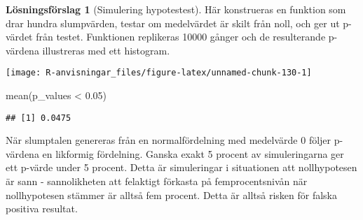 \documentclass[
]{book}
\newenvironment{Shaded}{\begin{snugshade}}{\end{snugshade}}
\newcommand{\AttributeTok}[1]{\textcolor[rgb]{0.77,0.63,0.00}{#1}}
\newcommand{\ControlFlowTok}[1]{\textcolor[rgb]{0.13,0.29,0.53}{\textbf{#1}}}
\newcommand{\DecValTok}[1]{\textcolor[rgb]{0.00,0.00,0.81}{#1}}
\newcommand{\FloatTok}[1]{\textcolor[rgb]{0.00,0.00,0.81}{#1}}
\newcommand{\FunctionTok}[1]{\textcolor[rgb]{0.00,0.00,0.00}{#1}}
\newcommand{\NormalTok}[1]{#1}
\newcommand{\OtherTok}[1]{\textcolor[rgb]{0.56,0.35,0.01}{#1}}
\newcommand{\SpecialCharTok}[1]{\textcolor[rgb]{0.00,0.00,0.00}{#1}}
\theoremstyle{definition}
\theoremstyle{definition}
\theoremstyle{definition}
\theoremstyle{definition}
\newtheorem{hypothesis}{Lösningsförslag}[chapter]
\theoremstyle{remark}
\begin{document}
\begin{hypothesis}[Simulering hypotestest]
Här konstrueras en funktion som drar hundra slumpvärden, testar om medelvärdet är skilt från noll, och ger ut p-värdet från testet. Funktionen replikeras 10000 gånger och de resulterande p-värdena illustreras med ett histogram.

\begin{Shaded}
\end{Shaded}

\begin{center}\texttt{[image: R-anvisningar\_files/figure-latex/unnamed-chunk-130-1]} \end{center}

\begin{Shaded}
\begin{Highlighting}[]
\FunctionTok{mean}\NormalTok{(p\_values }\SpecialCharTok{\textless{}} \FloatTok{0.05}\NormalTok{)}
\end{Highlighting}
\end{Shaded}

\begin{verbatim}
## [1] 0.0475
\end{verbatim}

När slumptalen genereras från en normalfördelning med medelvärde 0 följer p-värdena en likformig fördelning. Ganska exakt 5 procent av simuleringarna ger ett p-värde under 5 procent. Detta är simuleringar i situationen att nollhypotesen är sann - sannolikheten att felaktigt förkasta på femprocentsnivån när nollhypotesen stämmer är alltså fem procent. Detta är alltså risken för falska positiva resultat.


\end{hypothesis}
\end{document}
